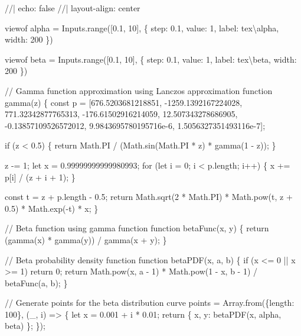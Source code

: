 \documentclass[
  letterpaper,
  DIV=11,
  numbers=noendperiod]{scrreprt}
\newenvironment{Shaded}{\begin{snugshade}}{\end{snugshade}}
\newcommand{\NormalTok}[1]{\textcolor[rgb]{0.00,0.23,0.31}{#1}}
\begin{document}
\label{observable}
\begin{Shaded}
\begin{Highlighting}[]
\NormalTok{//| echo: false}
\NormalTok{//| layout{-}align: center}

\NormalTok{viewof alpha = Inputs.range([0.1, 10], \{}
\NormalTok{  step: 0.1,}
\NormalTok{  value: 1,}
\NormalTok{  label: tex\textasciigrave{}\textbackslash{}alpha\textasciigrave{},}
\NormalTok{  width: 200}
\NormalTok{\})}

\NormalTok{viewof beta = Inputs.range([0.1, 10], \{}
\NormalTok{  step: 0.1,}
\NormalTok{  value: 1,}
\NormalTok{  label: tex\textasciigrave{}\textbackslash{}beta\textasciigrave{},}
\NormalTok{  width: 200}
\NormalTok{\})}

\NormalTok{// Gamma function approximation using Lanczos approximation}
\NormalTok{function gamma(z) \{}
\NormalTok{    const p = [676.5203681218851, {-}1259.1392167224028, 771.32342877765313,}
\NormalTok{        {-}176.61502916214059, 12.507343278686905, {-}0.13857109526572012,}
\NormalTok{        9.9843695780195716e{-}6, 1.5056327351493116e{-}7];}
    
\NormalTok{    if (z \textless{} 0.5) \{}
\NormalTok{        return Math.PI / (Math.sin(Math.PI * z) * gamma(1 {-} z));}
\NormalTok{    \}}
    
\NormalTok{    z {-}= 1;}
\NormalTok{    let x = 0.99999999999980993;}
\NormalTok{    for (let i = 0; i \textless{} p.length; i++) \{}
\NormalTok{        x += p[i] / (z + i + 1);}
\NormalTok{    \}}
    
\NormalTok{    const t = z + p.length {-} 0.5;}
\NormalTok{    return Math.sqrt(2 * Math.PI) * Math.pow(t, z + 0.5) * Math.exp({-}t) * x;}
\NormalTok{\}}

\NormalTok{// Beta function using gamma function}
\NormalTok{function betaFunc(x, y) \{}
\NormalTok{    return (gamma(x) * gamma(y)) / gamma(x + y);}
\NormalTok{\}}

\NormalTok{// Beta probability density function}
\NormalTok{function betaPDF(x, a, b) \{}
\NormalTok{    if (x \textless{}= 0 || x \textgreater{}= 1) return 0;}
\NormalTok{    return Math.pow(x, a {-} 1) * Math.pow(1 {-} x, b {-} 1) / betaFunc(a, b);}
\NormalTok{\}}

\NormalTok{// Generate points for the beta distribution curve}
\NormalTok{points = Array.from(\{length: 100\}, (\_, i) =\textgreater{} \{}
\NormalTok{  let x = 0.001 + i * 0.01;}
\NormalTok{  return \{ x, y: betaPDF(x, alpha, beta) \};}
\NormalTok{\});}


\end{Highlighting}
\end{Shaded}
\end{document}
